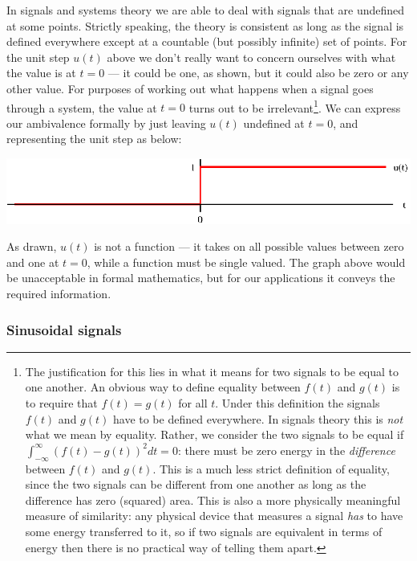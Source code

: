 \documentclass[10pt]{beamer}
\begin{document}
In signals and systems theory we are able to deal with signals that are undefined at some points.  Strictly speaking, the theory is consistent as long as the signal is defined everywhere except at a countable (but possibly infinite) set of points.  For the unit step $u(t)$ above we don't really want to concern ourselves with what the value is at $t=0$ --- it could be one, as shown, but it could also be zero or any other value.  For purposes of working out what happens when a signal goes through a system, the value at $t=0$ turns out to be irrelevant\footnote{The justification for this lies in what it means for two signals to be equal to one another.  An obvious way to define equality between $f(t)$ and $g(t)$ is to require that $f(t) = g(t)$ for all $t$.  Under this definition the signals $f(t)$ and $g(t)$ have to be defined everywhere.  In signals theory this is {\em not} what we mean by equality.  Rather, we consider the two signals to be equal if $\int_{-\infty}^{\infty} (f(t) - g(t))^2 dt = 0$:  there must be zero energy in the {\em difference} between $f(t)$ and $g(t)$.  This is a much less strict definition of equality, since the two signals can be different from one another as long as the difference has zero (squared) area.  This is also a more physically meaningful measure of similarity:  any physical device that measures a signal {\em has} to have some energy transferred to it, so if two signals are equivalent in terms of energy then there is no practical way of telling them apart.}.  We can express our ambivalence formally by just leaving $u(t)$ undefined at $t=0$, and representing the unit step as below:
\begin{center}
\includegraphics{unitstep2}
\end{center}
As drawn, $u(t)$ is not a function --- it takes on all possible values between zero and one at $t=0$, while a function must be single valued.  The graph above would be unacceptable in formal mathematics, but for our applications it conveys the required information.

\subsubsection{Sinusoidal signals}
\end{document}

